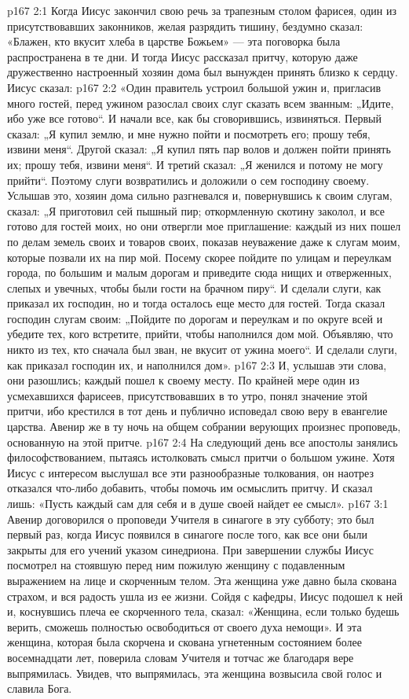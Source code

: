 \vs p167 2:1 Когда Иисус закончил свою речь за трапезным столом фарисея, один из присутствовавших законников, желая разрядить тишину, бездумно сказал: «Блажен, кто вкусит хлеба в царстве Божьем» --- эта поговорка была распространена в те дни. И тогда Иисус рассказал притчу, которую даже дружественно настроенный хозяин дома был вынужден принять близко к сердцу. Иисус сказал:
\vs p167 2:2 «Один правитель устроил большой ужин и, пригласив много гостей, перед ужином разослал своих слуг сказать всем званным: „Идите, ибо уже все готово“. И начали все, как бы сговорившись, извиняться. Первый сказал: „Я купил землю, и мне нужно пойти и посмотреть его; прошу тебя, извини меня“. Другой сказал: „Я купил пять пар волов и должен пойти принять их; прошу тебя, извини меня“. И третий сказал: „Я женился и потому не могу прийти“. Поэтому слуги возвратились и доложили о сем господину своему. Услышав это, хозяин дома сильно разгневался и, повернувшись к своим слугам, сказал: „Я приготовил сей пышный пир; откормленную скотину заколол, и все готово для гостей моих, но они отвергли мое приглашение: каждый из них пошел по делам земель своих и товаров своих, показав неуважение даже к слугам моим, которые позвали их на пир мой. Посему скорее пойдите по улицам и переулкам города, по большим и малым дорогам и приведите сюда нищих и отверженных, слепых и увечных, чтобы были гости на брачном пиру“. И сделали слуги, как приказал их господин, но и тогда осталось еще место для гостей. Тогда сказал господин слугам своим: „Пойдите по дорогам и переулкам и по округе всей и убедите тех, кого встретите, прийти, чтобы наполнился дом мой. Объявляю, что никто из тех, кто сначала был зван, не вкусит от ужина моего“. И сделали слуги, как приказал господин их, и наполнился дом».
\vs p167 2:3 \pc И, услышав эти слова, они разошлись; каждый пошел к своему месту. По крайней мере один из усмехавшихся фарисеев, присутствовавших в то утро, понял значение этой притчи, ибо крестился в тот день и публично исповедал свою веру в евангелие царства. Авенир же в ту ночь на общем собрании верующих произнес проповедь, основанную на этой притче.
\vs p167 2:4 На следующий день все апостолы занялись философствованием, пытаясь истолковать смысл притчи о большом ужине. Хотя Иисус с интересом выслушал все эти разнообразные толкования, он наотрез отказался что\hyp{}либо добавить, чтобы помочь им осмыслить притчу. И сказал лишь: «Пусть каждый сам для себя и в душе своей найдет ее смысл».
\vs p167 3:1 Авенир договорился о проповеди Учителя в синагоге в эту субботу; это был первый раз, когда Иисус появился в синагоге после того, как все они были закрыты для его учений указом синедриона. При завершении службы Иисус посмотрел на стоявшую перед ним пожилую женщину с подавленным выражением на лице и скорченным телом. Эта женщина уже давно была скована страхом, и вся радость ушла из ее жизни. Сойдя с кафедры, Иисус подошел к ней и, коснувшись плеча ее скорченного тела, сказал: «Женщина, если только будешь верить, сможешь полностью освободиться от своего духа немощи». И эта женщина, которая была скорчена и скована угнетенным состоянием более восемнадцати лет, поверила словам Учителя и тотчас же благодаря вере выпрямилась. Увидев, что выпрямилась, эта женщина возвысила свой голос и славила Бога.
